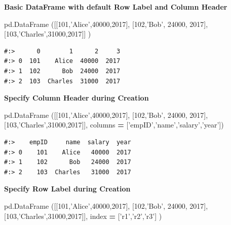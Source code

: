 \documentclass[
]{book}
\newenvironment{Shaded}{\begin{snugshade}}{\end{snugshade}}
\newcommand{\DecValTok}[1]{\textcolor[rgb]{0.06,0.06,0.06}{#1}}
\newcommand{\NormalTok}[1]{#1}
\newcommand{\OperatorTok}[1]{\textcolor[rgb]{0.43,0.43,0.43}{\textbf{#1}}}
\newcommand{\StringTok}[1]{\textcolor[rgb]{0.5,0.5,0.5}{#1}}
\begin{document}
\textbf{Basic DataFrame with default Row Label and Column Header}

\begin{Shaded}
\begin{Highlighting}[]
\NormalTok{pd.DataFrame ([[}\DecValTok{101}\NormalTok{,}\StringTok{'Alice'}\NormalTok{,}\DecValTok{40000}\NormalTok{,}\DecValTok{2017}\NormalTok{],}
\NormalTok{               [}\DecValTok{102}\NormalTok{,}\StringTok{'Bob'}\NormalTok{,  }\DecValTok{24000}\NormalTok{, }\DecValTok{2017}\NormalTok{], }
\NormalTok{               [}\DecValTok{103}\NormalTok{,}\StringTok{'Charles'}\NormalTok{,}\DecValTok{31000}\NormalTok{,}\DecValTok{2017}\NormalTok{]] )}
\end{Highlighting}
\end{Shaded}

\begin{verbatim}
#:>      0        1      2     3
#:> 0  101    Alice  40000  2017
#:> 1  102      Bob  24000  2017
#:> 2  103  Charles  31000  2017
\end{verbatim}

\textbf{Specify Column Header during Creation}

\begin{Shaded}
\begin{Highlighting}[]
\NormalTok{pd.DataFrame ([[}\DecValTok{101}\NormalTok{,}\StringTok{'Alice'}\NormalTok{,}\DecValTok{40000}\NormalTok{,}\DecValTok{2017}\NormalTok{],}
\NormalTok{               [}\DecValTok{102}\NormalTok{,}\StringTok{'Bob'}\NormalTok{,  }\DecValTok{24000}\NormalTok{, }\DecValTok{2017}\NormalTok{], }
\NormalTok{               [}\DecValTok{103}\NormalTok{,}\StringTok{'Charles'}\NormalTok{,}\DecValTok{31000}\NormalTok{,}\DecValTok{2017}\NormalTok{]], columns }\OperatorTok{=}\NormalTok{ [}\StringTok{'empID'}\NormalTok{,}\StringTok{'name'}\NormalTok{,}\StringTok{'salary'}\NormalTok{,}\StringTok{'year'}\NormalTok{])}
\end{Highlighting}
\end{Shaded}

\begin{verbatim}
#:>    empID     name  salary  year
#:> 0    101    Alice   40000  2017
#:> 1    102      Bob   24000  2017
#:> 2    103  Charles   31000  2017
\end{verbatim}

\textbf{Specify Row Label during Creation}

\begin{Shaded}
\begin{Highlighting}[]
\NormalTok{pd.DataFrame ([[}\DecValTok{101}\NormalTok{,}\StringTok{'Alice'}\NormalTok{,}\DecValTok{40000}\NormalTok{,}\DecValTok{2017}\NormalTok{],}
\NormalTok{               [}\DecValTok{102}\NormalTok{,}\StringTok{'Bob'}\NormalTok{,  }\DecValTok{24000}\NormalTok{, }\DecValTok{2017}\NormalTok{], }
\NormalTok{               [}\DecValTok{103}\NormalTok{,}\StringTok{'Charles'}\NormalTok{,}\DecValTok{31000}\NormalTok{,}\DecValTok{2017}\NormalTok{]], index   }\OperatorTok{=}\NormalTok{ [}\StringTok{'r1'}\NormalTok{,}\StringTok{'r2'}\NormalTok{,}\StringTok{'r3'}\NormalTok{] )}
\end{Highlighting}
\end{Shaded}
\end{document}
